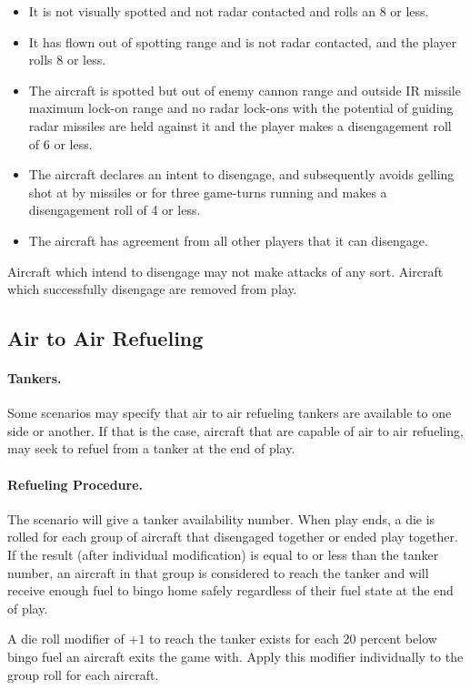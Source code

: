 \begin{itemize}

    \item It is not visually spotted and not radar contacted and rolls an 8 or less.

    \item It has flown out of spotting range and is not radar contacted, and the player rolls 8 or less.

    \item The aircraft is spotted but out of enemy cannon range and outside IR missile maximum lock-on range and no radar lock-ons with the potential of guiding radar missiles are held against it and the player makes a disengagement roll of 6 or less.

    \item The aircraft declares an intent to disengage, and subsequently avoids gelling shot at by missiles or for three game-turns running and makes a disengagement roll of 4 or less.

    \item The aircraft has agreement from all other players that it can disengage.

\end{itemize}

Aircraft which intend to disengage may not make attacks of any sort. Aircraft which successfully disengage are removed from play.

\subsection{Air to Air Refueling}

\paragraph{Tankers.} Some scenarios may specify that air to air refueling tankers are available to one side or another. If that is the case, aircraft that are capable of air to air refueling, may seek to refuel from a tanker at the end of play.

\paragraph{Refueling Procedure.} The scenario will give a tanker availability number. When play ends, a die is rolled for each group of aircraft that disengaged together or ended play together. If the result (after individual modification) is equal to or less than the tanker number, an aircraft in that group is considered to reach the tanker and will receive enough fuel to bingo home safely regardless of their fuel state at the end of play.

A die roll modifier of $+1$ to reach the tanker exists for each 20 percent below bingo fuel an aircraft exits the game with. Apply this modifier individually to the group roll for each aircraft.

